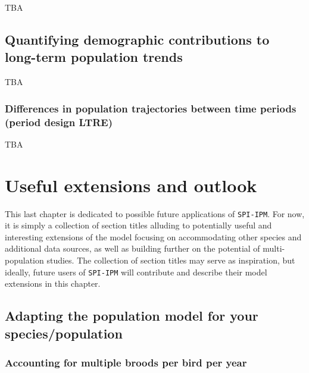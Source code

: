 \documentclass[
]{book}
\begin{document}
TBA

\hypertarget{quantifying-demographic-contributions-to-long-term-population-trends}{%
\section{Quantifying demographic contributions to long-term population trends}\label{quantifying-demographic-contributions-to-long-term-population-trends}}

TBA

\hypertarget{differences-in-population-trajectories-between-time-periods-period-design-ltre}{%
\subsection{Differences in population trajectories between time periods (period design LTRE)}\label{differences-in-population-trajectories-between-time-periods-period-design-ltre}}

TBA

\hypertarget{ExtOutlook}{%
\chapter{Useful extensions and outlook}\label{ExtOutlook}}

This last chapter is dedicated to possible future applications of \texttt{SPI-IPM}. For now, it is simply a collection of section titles alluding to potentially useful and interesting extensions of the model focusing on accommodating other species and additional data sources, as well as building further on the potential of multi-population studies.
The collection of section titles may serve as inspiration, but ideally, future users of \texttt{SPI-IPM} will contribute and describe their model extensions in this chapter.

\hypertarget{adapting-the-population-model-for-your-speciespopulation}{%
\section{Adapting the population model for your species/population}\label{adapting-the-population-model-for-your-speciespopulation}}

\hypertarget{accounting-for-multiple-broods-per-bird-per-year}{%
\subsection{Accounting for multiple broods per bird per year}\label{accounting-for-multiple-broods-per-bird-per-year}}
\end{document}
